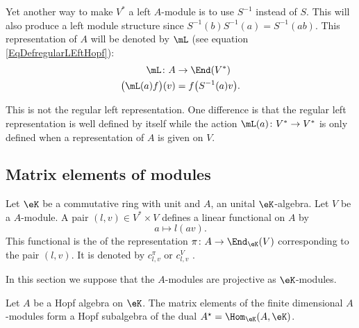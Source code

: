 Yet another way to make \( V^*\) a left \( A\)-module is to use \( S^{-1}\) instead of \( S\). This will also produce a left module structure since \( S^{-1}(b)S^{-1}(a)=S^{-1}(ab)\). This representation of \( A\) will be denoted by \( \mL\) (see equation \eqref{EqDefregularLEftHopf}):
\begin{equation}        \label{EqDefTroisleftmodAstar}
    \begin{aligned}
        \mL\colon A&\to \End(V^*) \\
        \big( \mL(a)f \big)(v)&=f\big( S^{-1}(a)v \big). 
    \end{aligned}
\end{equation}

\begin{remark}
    This is not the regular left representation. One difference is that the regular left representation is well defined by itself while the action \( \mL(a)\colon V^*\to V^*\) is only defined when a representation of \( A\) is given on \( V\).    
\end{remark}

\subsection{Matrix elements of modules}

Let \( \eK\) be a commutative ring with unit and \( A\), an unital \( \eK\)-algebra. Let \( V\) be a \( A\)-module. A pair \( (l,v)\in V^*\times V\) defines a linear functional on \( A\) by
\begin{equation}
    a\mapsto l(av).
\end{equation}
This functional is the  of the representation \( \pi\colon A\to \End_{\eK}(V)\) corresponding to the pair \( (l,v)\). It is denoted by \( c^{\pi}_{l,v}\) or \( c^V_{l,v}\)  .

In this section we suppose that the \( A\)-modules are projective as \( \eK\)-modules.

\begin{proposition}     \label{PropHopfDual}
    Let \( A\) be a Hopf algebra on \( \eK\). The matrix elements of the finite dimensional \( A\)-modules form a Hopf subalgebra of the dual \( A^{\star}=\Hom_{\eK}(A,\eK)\).
\end{proposition}

